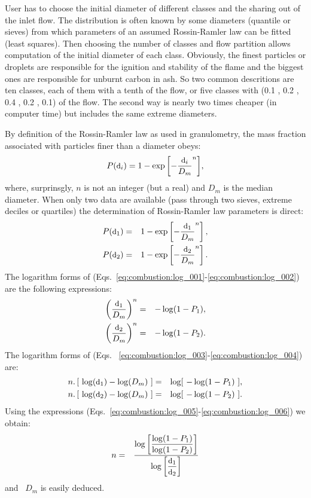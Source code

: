 User has to choose the initial diameter of different classes and the sharing out
of the inlet flow. The distribution is often known by some diameters (quantile
or sieves) from which parameters of an assumed Rossin-Ramler law can be fitted
(least squares). Then choosing the number of classes and flow partition allows
computation of the initial diameter of each class. Obviously, the finest
particles or droplets are responsible for the ignition and stability of the
flame and the biggest ones are responsible for unburnt carbon in ash. So two
common descritions are ten classes, each of them with a tenth of the flow, or
five classes with (0.1 , 0.2 , 0.4 , 0.2 , 0.1) of the flow. The second way is
nearly two times cheaper (in computer time) but includes the same extreme
diameters.

By definition of the Rossin-Ramler law as used in granulometry, the mass
fraction associated with particles finer than a diameter obeys:
\begin{equation*}
  P(\mbox{\small d}_i) = 1-\exp{\left[-\dfrac{\mbox{\small d}_i}{D_m} ^n \right]},
\end{equation*}
where, surprinsgly, $n$ is not an integer (but a real) and $D_m$ is the median
diameter. When only two data are available (pass through two sieves, extreme
deciles or quartiles) the determination of Rossin-Ramler law parameters is
direct:
\begin{eqnarray}
  \displaystyle P(\mbox{\small d}_1) &=& 1-\exp\left[-\frac{\mbox{\small d}_1}{D_m}^n\right], \label{eq:combustion:log_001} \\
  \displaystyle P(\mbox{\small d}_2) &=& 1-\exp\left[-\frac{\mbox{\small d}_2}{D_m}^n\right]. \label{eq:combustion:log_002}
\end{eqnarray}
The logarithm forms of (Eqs.~\ref{eq:combustion:log_001}-\ref{eq:combustion:log_002}) are the
following expressions:
\begin{eqnarray}
  \displaystyle \left(\frac{\mbox{\small d}_1}{D_m} \right)^n &=& - \log(1-P_1), \label{eq:combustion:log_003} \\
  \displaystyle \left(\frac{\mbox{\small d}_2}{D_m} \right)^n &=& - \log(1-P_2). \label{eq:combustion:log_004}
\end{eqnarray}
The logarithm forms of (Eqs. ~\ref{eq:combustion:log_003}-\ref{eq:combustion:log_004})
are:
\begin{eqnarray}
  \displaystyle n . \left[~ \log(\mbox{\small d}_1)-\log(D_m)~\right] &=& \log[~-\log(1-P_1)~], \label{eq:combustion:log_005} \\
  \displaystyle n . \left[~ \log(\mbox{\small d}_2)-\log(D_m)~\right] &=& \log[~-\log(1-P_2)~]. \label{eq:combustion:log_006}
\end{eqnarray}
Using the expressions (Eqs.~\ref{eq:combustion:log_005}-\ref{eq:combustion:log_006}) we obtain:
\begin{eqnarray}
n &=& \frac{\log \left[\displaystyle\frac{ \log(1-P_1)}{\log(1-P_2)}\right]}{\displaystyle\log\left[\frac{\mbox{\small d}_1}{\mbox{\small d}_2} \right]}
\end{eqnarray}
and~ $D_m$ is easily deduced.

